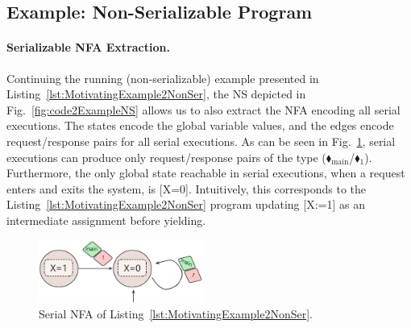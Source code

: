 %


\subsection{Example: Non-Serializable Program}
\label{subsec:ns-not-serializable}

\paragraph{Serializable NFA Extraction.}

Continuing the running (non-serializable) example presented in Listing~\ref{lst:MotivatingExample2NonSer}, the NS depicted in Fig.~\ref{fig:code2ExampleNS} allows us to also extract the NFA encoding all serial executions. The states encode the global variable values, and the edges encode request/response pairs for all serial executions. As can be seen in Fig.~\ref{fig:code2ExampleNFA}, serial executions can produce only request/response pairs of the type ({\color{ForestGreen}$\blacklozenge_\text{main}$/{\color{red}$\blacklozenge_1$}}). Furthermore, the only global state reachable in serial executions, when a request enters and exits the system, is [X=0].
%
Intuitively, this corresponds to the Listing~\ref{lst:MotivatingExample2NonSer} program updating [X:=1] as an intermediate assignment before yielding.

\begin{figure}  %
	\centering
	\includegraphics[width=0.48\textwidth,trim=0 0 0 0,clip]{plots/code_2_NFA_v3.pdf}
	\caption{Serial NFA of Listing~\ref{lst:MotivatingExample2NonSer}.}
	\label{fig:code2ExampleNFA}
\end{figure}



